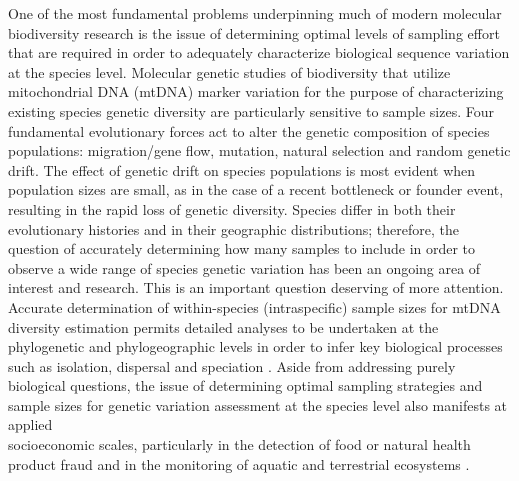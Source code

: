 One of the most fundamental problems underpinning much of modern molecular \\ biodiversity research is the issue of determining optimal levels of sampling effort that are required in order to adequately characterize biological sequence variation at the species level. Molecular genetic studies of biodiversity that utilize mitochondrial DNA (mtDNA) marker variation for the purpose of characterizing existing species genetic diversity are particularly sensitive to sample sizes. Four fundamental evolutionary forces act to alter the genetic composition of species populations: migration/gene flow, mutation, natural selection and random genetic drift. The effect of genetic drift on species populations is most evident when population sizes are small, as in the case of a recent bottleneck or founder event, resulting in the rapid loss of genetic diversity. Species differ in both their evolutionary histories and in their geographic distributions; therefore, the question of accurately determining how many samples to include in order to observe a wide range of species genetic variation has been an ongoing area of interest and research. This is an important question deserving of more attention. Accurate determination of within-species (intraspecific) sample sizes for mtDNA diversity estimation permits detailed analyses to be undertaken at the phylogenetic and phylogeographic levels in order to infer key biological processes such as isolation, dispersal and speciation \cite{avise1987intraspecific, dixon2006means, funk2003species}. Aside from addressing purely biological questions, the issue of determining optimal sampling strategies and \\ sample sizes for genetic variation assessment at the species level also manifests at applied \\ socioeconomic scales, particularly in the detection of food or natural health product fraud and in the monitoring of aquatic and terrestrial ecosystems \cite{hunter2015environmental}.



